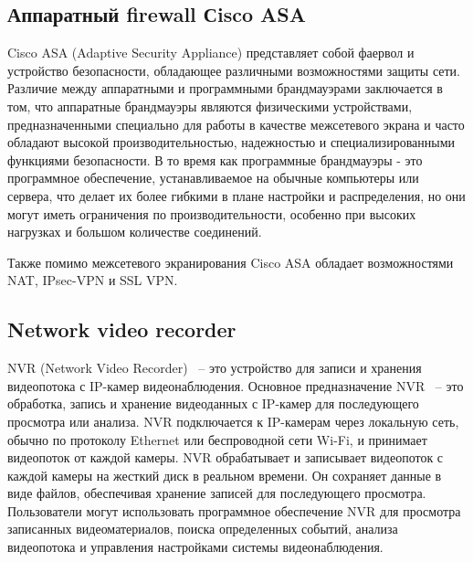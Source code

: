 \subsection{Аппаратный firewall Сisco ASA}

Cisco ASA (Adaptive Security Appliance) представляет собой фаервол и 
устройство безопасности, обладающее различными возможностями защиты сети.
Различие между аппаратными и программными брандмауэрами заключается в том, 
что аппаратные брандмауэры являются физическими устройствами, 
предназначенными специально для работы в качестве межсетевого экрана и часто обладают высокой 
производительностью, надежностью и специализированными функциями безопасности. 
В то время как программные брандмауэры - это программное обеспечение, 
устанавливаемое на обычные компьютеры или сервера, что делает их более гибкими в плане настройки и распределения, 
но они могут иметь ограничения по производительности, особенно при высоких нагрузках и большом количестве соединений.

Также помимо межсетевого экранирования Cisco ASA обладает возможностями NAT, IPsec-VPN и SSL VPN.

\subsection{Network video recorder}

NVR (Network Video Recorder) ~-- это устройство для записи и хранения видеопотока с IP-камер видеонаблюдения. 
Основное предназначение NVR ~-- это обработка, запись и хранение видеоданных с IP-камер для последующего просмотра или анализа.
NVR подключается к IP-камерам через локальную сеть, обычно по протоколу Ethernet или беспроводной сети Wi-Fi, 
и принимает видеопоток от каждой камеры. NVR обрабатывает и записывает видеопоток с каждой камеры на жесткий диск в реальном времени. 
Он сохраняет данные в виде файлов, обеспечивая хранение записей для последующего просмотра.
Пользователи могут использовать программное обеспечение NVR для просмотра записанных видеоматериалов, поиска определенных событий, 
анализа видеопотока и управления настройками системы видеонаблюдения.